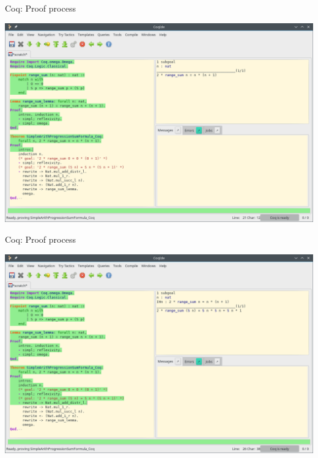 \documentclass[aspectratio=169, 12pt, fleqn]{beamer}
\begin{document}
\begin{frame}[fragile]{Coq: Proof process}
\begin{center}
  \includegraphics[scale=0.38]{img/coq_arith_2.png}
\end{center}
\end{frame}

\begin{frame}[fragile]{Coq: Proof process}
\begin{center}
  \includegraphics[scale=0.38]{img/coq_arith_3.png}
\end{center}
\end{frame}
\end{document}
